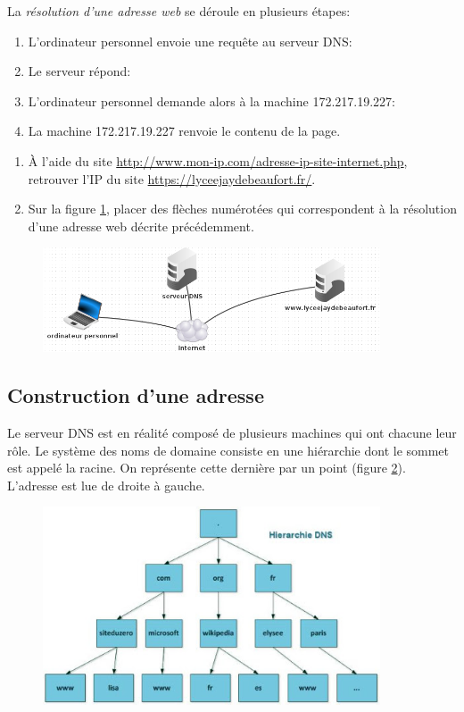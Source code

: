 \documentclass[a4paper,11pt]{article}
\begin{document}
\begin{Form}
La \emph{résolution d'une adresse web} se déroule en plusieurs étapes:
\begin{enumerate}
\item L'ordinateur personnel envoie une requête au serveur DNS:\\ 
\item Le serveur répond: 
\item L'ordinateur personnel demande alors à la machine 172.217.19.227: 
\item La machine 172.217.19.227 renvoie le contenu de la page.
\end{enumerate}
\begin{activite}
\begin{enumerate}
\item À l'aide du site \url{http://www.mon-ip.com/adresse-ip-site-internet.php}, retrouver l'IP du site \url{https://lyceejaydebeaufort.fr/}.
\item Sur la figure \ref{requete}, placer des flèches numérotées qui correspondent à la résolution d'une adresse web décrite précédemment.
\end{enumerate}

\end{activite}
\begin{figure}[!h]
\centering
\includegraphics[width=10cm]{ressources/serveur-dns.png}
\label{requete}
\end{figure}

\subsection{Construction d'une adresse}
Le serveur DNS est en réalité composé de plusieurs machines qui ont chacune leur rôle. Le système des noms de domaine consiste en une hiérarchie dont le sommet est appelé la racine. On représente cette dernière par un point (figure \ref{hierarchie}). L'adresse est lue de droite à gauche. 
\begin{figure}[!h]
\centering
\includegraphics[width=10cm]{ressources/hierarchie.jpg}
\label{hierarchie}
\end{figure}


\end{Form}
\end{document}
